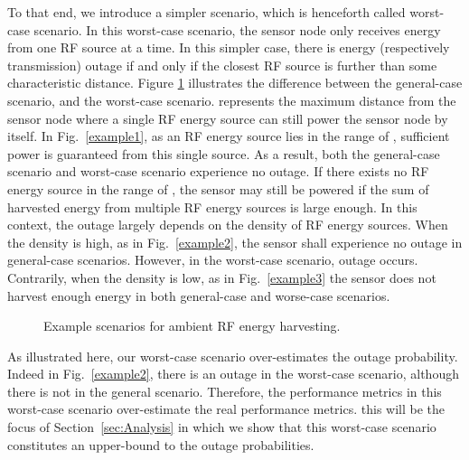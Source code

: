 \documentclass[12pt,draftclsnofoot,onecolumn]{IEEEtran}
\begin{document}
To that end, we introduce a simpler scenario, which is henceforth called worst-case scenario.
In this worst-case scenario, the sensor node only receives energy from one RF source at a time. In this simpler case, there is energy (respectively transmission) outage if and only if the closest RF source is further than some characteristic distance.
Figure \ref{example} illustrates the difference between the general-case scenario, and the worst-case scenario.  represents the maximum distance from the sensor node where a single RF energy source can still power the sensor node by itself. 
In Fig.~\ref{example1}, as an RF energy source lies in the range of , sufficient power is guaranteed from this single source. As a result, both the general-case scenario and worst-case scenario experience no outage. If there exists no RF energy source in the range of , the sensor may still be powered if the sum of harvested energy from multiple RF energy sources is large enough. In this context, the outage largely depends on the density of RF energy sources. When the density is high, as in Fig.~\ref{example2}, the sensor shall experience no outage in general-case scenarios. However, in the worst-case scenario, 
outage occurs. Contrarily, when the density is low, as in Fig.~\ref{example3} the sensor does not harvest enough energy in both general-case and worse-case scenarios.        




\begin{figure} 
\centering
{} 
 \centering
   \centering
    \centering
  \caption{Example scenarios for ambient RF energy harvesting.}
\label{example}
\end{figure}  

As illustrated here, our worst-case scenario over-estimates the outage probability. Indeed in Fig.~\ref{example2}, there is an outage in the worst-case scenario, although there is not in the general scenario. 
Therefore, the performance metrics in this worst-case scenario over-estimate the real performance metrics. this will be the focus of Section~\ref{sec:Analysis} in which we show that this worst-case scenario constitutes an upper-bound to the outage probabilities.
\end{document}
